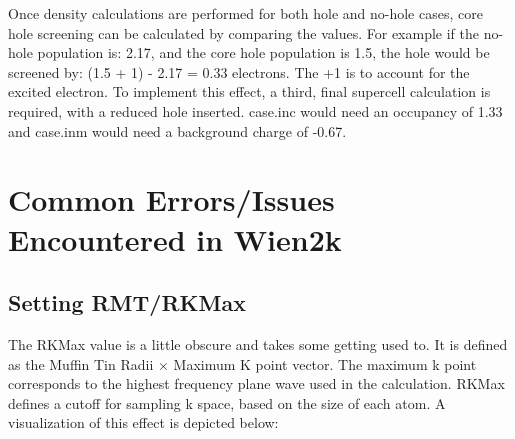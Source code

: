 \documentclass[12pt]{article}
\begin{document}
Once density calculations are performed for both hole and no-hole cases, core hole screening can be calculated by comparing the values.  For example if the no-hole population is: 2.17, and the core hole population is 1.5, the hole would be screened by:  (1.5 + 1) - 2.17 =  0.33 electrons. The +1 is to account for the excited electron.  To implement this effect, a third, final supercell calculation is required,  with a reduced hole inserted.  case.inc would need an occupancy of 1.33 and case.inm would need a background charge of -0.67. \\

\section{Common Errors/Issues Encountered in Wien2k}

\subsection{Setting RMT/RKMax}
The RKMax value is a little obscure and takes some getting used to.   It is defined as the Muffin Tin Radii $\times$ Maximum K point vector.   The maximum k point corresponds to the highest frequency plane wave used in the calculation. RKMax defines a cutoff for sampling  k space, based on the size of each atom.  A visualization of this effect is depicted below:
\end{document}
